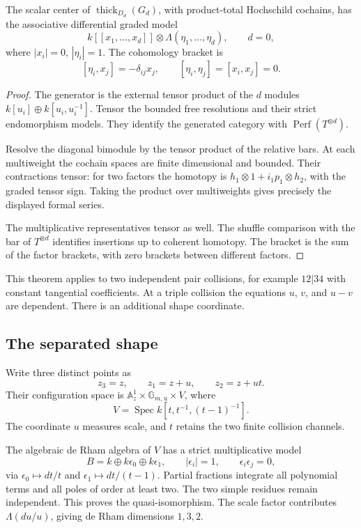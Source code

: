 \begin{theorem}\label{v4-arith:centers:thm:crossings}
The scalar center of $\operatorname{thick}_{D_d}(G_d)$,
with product-total Hochschild cochains, has the
associative differential graded model
\[
 k[[x_1,\ldots,x_d]]
 \otimes\Lambda(\eta_1,\ldots,\eta_d),\qquad d=0,
\]
where $|x_i|=0$, $|\eta_i|=1$. The cohomology
bracket is
\[
 [\eta_i,x_j]=-\delta_{ij}x_j,\qquad
 [\eta_i,\eta_j]=[x_i,x_j]=0.
\]
\end{theorem}

\begin{proof}
The generator is the external tensor product of
the $d$ modules $k[u_i]\oplus k[u_i,u_i^{-1}]$.
Tensor the bounded free resolutions and their
strict endomorphism models. They identify the
generated category with $\operatorname{Perf}(T^{\otimes d})$.

Resolve the diagonal bimodule by the tensor product
of the relative bars. At each multiweight the
cochain spaces are finite dimensional and bounded.
Their contractions tensor: for two factors the
homotopy is
$h_1\otimes1+i_1p_1\otimes h_2$, with the graded
tensor sign. Taking the product over multiweights
gives precisely the displayed formal series.

The multiplicative representatives tensor as well.
The shuffle comparison with the bar of
$T^{\otimes d}$ identifies insertions up to
coherent homotopy. The bracket is the sum of the
factor brackets, with zero brackets between
different factors.
\end{proof}

This theorem applies to two independent pair
collisions, for example $12|34$ with constant
tangential coefficients. At a triple collision
the equations $u$, $v$, and $u-v$ are dependent.
There is an additional shape coordinate.

\subsection{The separated shape}
\label{v4-arith:centers:subsec:shape}

Write three distinct points as
\[
 z_3=z,\qquad z_1=z+u,\qquad z_2=z+ut.
\]
Their configuration space is
$\mathbb A^1_z\times\mathbb G_{m,u}\times V$, where
\[
 V=\operatorname{Spec}k[t,t^{-1},(t-1)^{-1}].
\]
The coordinate $u$ measures scale, and $t$
retains the two finite collision channels.

The algebraic de Rham algebra of $V$ has a
strict multiplicative model
\[
 B=k\oplus k\epsilon_0\oplus k\epsilon_1,\qquad
 |\epsilon_i|=1,\qquad\epsilon_i\epsilon_j=0,
\]
via $\epsilon_0\mapsto dt/t$ and
$\epsilon_1\mapsto dt/(t-1)$. Partial fractions
integrate all polynomial terms and all poles of
order at least two. The two simple residues
remain independent. This proves the
quasi-isomorphism. The scale factor contributes
$\Lambda(du/u)$, giving de Rham dimensions
$1,3,2$.

